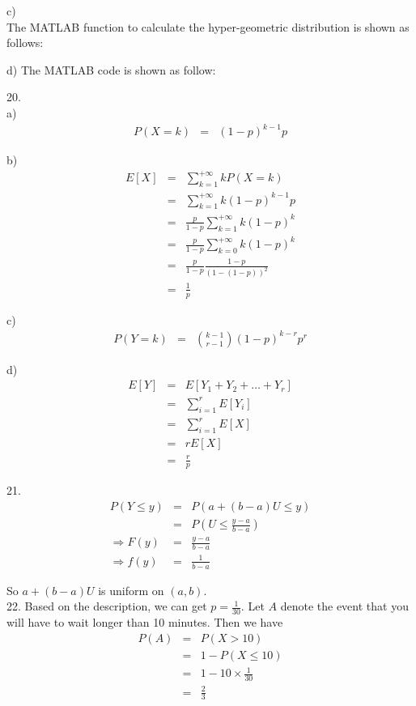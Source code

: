 \documentclass[12pt]{article}
\begin{document}
c) \\

The MATLAB function to calculate the hyper-geometric distribution is shown as follows:


d) The MATLAB code is shown as follow:


20. \\
a)
\begin{eqnarray*}
  P(X = k)
  &=& (1-p)^{k-1}p
\end{eqnarray*}

b)
\begin{eqnarray*}
  E[X]
  &=& \sum_{k=1}^{+\infty} kP(X = k) \\
  &=& \sum_{k=1}^{+\infty} k(1-p)^{k-1}p \\
  &=& \frac{p}{1-p} \sum_{k=1}^{+\infty} k(1-p)^k \\
  &=& \frac{p}{1-p} \sum_{k=0}^{+\infty} k(1-p)^k \\
  &=& \frac{p}{1-p} \frac {1-p}{\left( 1 - (1-p) \right)^2} \\
  &=& \frac {1}{p}
\end{eqnarray*}

c)
\begin{eqnarray*}
  P(Y=k)
  &=& \binom {k-1}{r-1} (1-p)^{k-r} p^r
\end{eqnarray*}

d)
\begin{eqnarray*}
  E[Y]
  &=& E[Y_1 + Y_2 + \dots + Y_r] \\
  &=& \sum_{i=1}^r E[Y_i] \\
  &=& \sum_{i=1}^r E[X] \\
  &=& r E[X] \\
  &=& \frac {r}{p}
\end{eqnarray*}

21.
\begin{eqnarray*}
  P(Y \le y)
  &=& P(a + (b-a)U \le y) \\
  &=& P(U \le \frac {y-a}{b-a}) \\
  \Rightarrow F(y) &=& \frac {y-a}{b-a} \\
  \Rightarrow f(y) &=& \frac {1}{b-a}
\end{eqnarray*}

So $a + (b-a)U$ is uniform on $(a,b)$. \\

22. Based on the description, we can get $p = \frac {1}{30}$. Let $A$ denote the event that you will have to wait longer than 10 minutes. Then we have
\begin{eqnarray*}
  P(A)
  &=& P(X > 10) \\
  &=& 1 - P(X \le 10) \\
  &=& 1 - 10 \times \frac {1}{30} \\
  &=& \frac {2}{3}
\end{eqnarray*}
\end{document}
